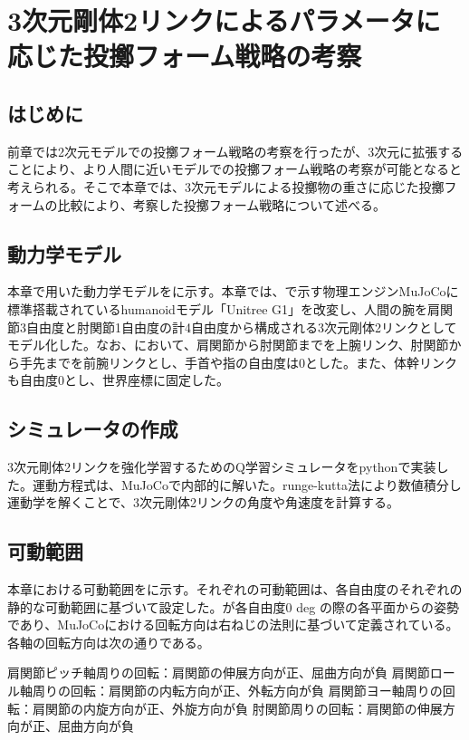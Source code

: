 \chapter[3次元剛体2リンクによるパラメータに応じた投擲フォーム戦略の考察]{3次元剛体2リンクによるパラメータに応じた投擲フォーム戦略の考察}

\section{はじめに}
前章では2次元モデルでの投擲フォーム戦略の考察を行ったが、3次元に拡張することにより、より人間に近いモデルでの投擲フォーム戦略の考察が可能となると考えられる。そこで本章では、3次元モデルによる投擲物の重さに応じた投擲フォームの比較により、考察した投擲フォーム戦略について述べる。
\section{動力学モデル}
本章で用いた動力学モデルをに示す。本章では、で示す物理エンジンMuJoCoに標準搭載されているhumanoidモデル「Unitree G1」を改変し、人間の腕を肩関節3自由度と肘関節1自由度の計4自由度から構成される3次元剛体2リンクとしてモデル化した。なお、において、肩関節から肘関節までを上腕リンク、肘関節から手先までを前腕リンクとし、手首や指の自由度は0とした。また、体幹リンクも自由度0とし、世界座標に固定した。
\section{シミュレータの作成}
3次元剛体2リンクを強化学習するためのQ学習シミュレータをpythonで実装した。運動方程式は、MuJoCoで内部的に解いた。runge-kutta法により数値積分し運動学を解くことで、3次元剛体2リンクの角度や角速度を計算する。
\section{可動範囲}
本章における可動範囲をに示す。それぞれの可動範囲は、各自由度のそれぞれの静的な可動範囲に基づいて設定した。が各自由度0 deg の際の各平面からの姿勢であり、MuJoCoにおける回転方向は右ねじの法則に基づいて定義されている。各軸の回転方向は次の通りである。

肩関節ピッチ軸周りの回転：肩関節の伸展方向が正、屈曲方向が負
肩関節ロール軸周りの回転：肩関節の内転方向が正、外転方向が負
肩関節ヨー軸周りの回転：肩関節の内旋方向が正、外旋方向が負
肘関節周りの回転：肩関節の伸展方向が正、屈曲方向が負

